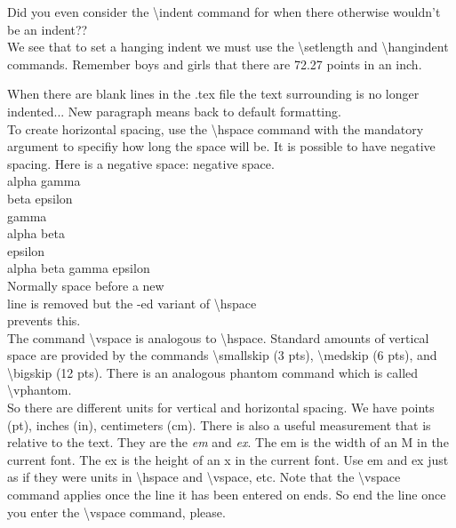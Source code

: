 \documentclass[12pt,draft]{amsart} %
\begin{document}
\indent Did you even consider the \textbackslash indent command for when there otherwise wouldn't be an indent?? \\[12pt]

\setlength{\hangindent}{30pt}
\noindent
We see that to set a hanging indent we must use the \textbackslash setlength and \textbackslash hangindent commands. Remember boys and girls that there are 72.27 points in an inch. 

When there are blank lines in the .tex file the text surrounding is no longer indented... New paragraph means back to default formatting.\\[12pt]
To create horizontal spacing, \hspace{12pt} use the \textbackslash hspace command with the mandatory argument to specifiy how long the space will be. It is possible to have negative spacing. Here is a negative space: \hspace{-15pt} negative space.\\[12pt]
alpha \phantom{beta} gamma \phantom{epsilon}\\
\phantom{alpha} beta \phantom{gamma} epsilon \\
\phantom{alpha beta} gamma \phantom{epsilon} \\
alpha beta \\
\phantom{alpha beta gamma} epsilon \\
alpha beta gamma epsilon \\

Normally space before a new \\
\hspace*{20pt} line is removed but the \textasteriskcentered -ed variant of \textbackslash hspace \\
\hspace*{20pt} prevents this. \\

The command \textbackslash vspace is analogous to \textbackslash hspace. Standard amounts of vertical space are provided by the commands \textbackslash smallskip (3 pts), \textbackslash medskip (6 pts), and \textbackslash bigskip (12 pts). There is an analogous phantom command which is called \textbackslash vphantom.\\
\indent So there are different units for vertical and horizontal spacing. We have points (pt), inches (in), centimeters (cm). There is also a useful measurement that is relative to the text. They are the \emph{em} and \emph{ex}. The em is the width of an M in the current font. The ex is the height of an x in the current font. Use em and ex just as if they were units in \textbackslash hspace and \textbackslash vspace, etc. Note that the \textbackslash vspace command applies once the line it has been entered on ends. So end the line once you enter the \textbackslash vspace command, please. 
\end{document}
